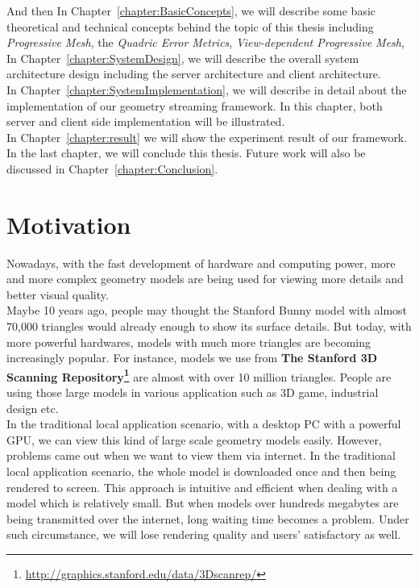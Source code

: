 And then In Chapter~\ref{chapter:BasicConcepts}, we will describe some basic theoretical and technical concepts behind the topic of this thesis including \emph{Progressive Mesh}, the \emph{Quadric Error Metrics}, \emph{View-dependent Progressive Mesh}, \etc \\

In Chapter~\ref{chapter:SystemDesign}, we will describe the overall system architecture design including the server architecture and client architecture. \\

In Chapter~\ref{chapter:SystemImplementation}, we will describe in detail about the implementation of our geometry streaming framework. In this chapter, both server and client side implementation will be illustrated.\\

In Chapter~\ref{chapter:result} we will show the experiment result of our framework. \\

In the last chapter, we will conclude this thesis. Future work will also be discussed in Chapter~\ref{chapter:Conclusion}. 

\section{Motivation}
\label{section:motivation}

Nowadays, with the fast development of hardware and computing power, more and more complex geometry models are being used for viewing more details and better visual quality. \\

Maybe 10 years ago, people may thought the Stanford Bunny model with almost 70,000 triangles would already enough to show its surface details. But today, with more powerful hardwares, models with much more triangles are becoming increasingly popular. For instance, models we use from \textbf{The Stanford 3D Scanning Repository\footnote{\label{S3DSR}\url{http://graphics.stanford.edu/data/3Dscanrep/}}} are almost with over 10 million triangles. People are using those large models in various application such as 3D game, industrial design etc.\\

In the traditional local application scenario, with a desktop PC with a powerful GPU, we can view this kind of large scale geometry models easily. However, problems came out when we want to view them via internet. In the traditional local application scenario, the whole model is downloaded once and then being rendered to screen. This approach is intuitive and efficient when dealing with a model which is relatively small. But when models over hundreds megabytes are being transmitted over the internet, long waiting time becomes a problem. Under such circumstance, we will lose rendering quality and users' satisfactory as well. \\

